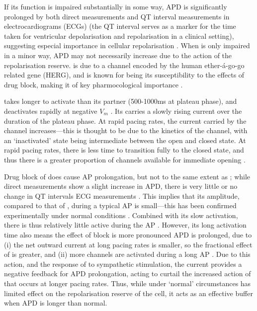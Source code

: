 \documentclass[../thesis-main.tex]{subfiles}
\begin{document}
 If its function is impaired substantially in some way, APD is significantly prolonged by both direct measurements and QT interval measurements in electrocardiograms (ECGs)  (the QT interval serves as a marker for the time taken for ventricular depolarisation and repolarisation in a clinical setting), suggesting especial importance in cellular repolarisation \citep{Varro2000, Lengyel2001, Jost2005}. When \ikr{} is only impaired in a minor way, APD may not necessarily increase due to the action of the repolarisation reserve. \ikr{} is due to a channel encoded by the human ether-\'a-go-go related gene (HERG), and is known for being its susceptibility to the effects of drug block, making it of key pharmocological importance \citep{Vandenberg2001, Haverkamp2000}.
 
 \iks{} takes longer to activate than its partner (500-1000ms at plateau phase), and deactivates rapidly at negative $V_m$ \citep{Jost2005, Varro2011}. Its carries a slowly rising current over the duration of the plateau phase. At rapid pacing rates, the current carried by the \iks{} channel increases---this is thought to be due to the kinetics of the channel, with an `inactivated' state being intermediate between the open and closed state. At rapid pacing rates, there is less time to transition fully to the closed state, and thus there is a greater proportion of \iks{} channels available for immediate opening \citep{Silva2005}.
 
 Drug block of \iks{} does cause AP prolongation, but not to the same extent as \ikr{}; while direct measurements show a slight increase in APD, there is very little or no change in QT intervals ECG measurements \citep{Varro2000, Lengyel2001, Jost2005}. This implies that its amplitude, compared to that of \ikr{}, during a typical AP is small---this has been confirmed experimentally under normal conditions \citep{Varro2011}. Combined with its slow activation, there is thus relatively little \iks{} active during the AP \citep{Jost2005}. However, its long activation time also means the effect of \iks{} block is more pronounced APD is prolonged, due to (i) the net outward current at long pacing rates is smaller, so the fractional effect of \iks{} is greater, and (ii) more channels are activated during a long AP \citep{Carmeliet2006}. Due to this action, and the response of \iks{} to sympathetic stimulation, the current provides a negative feedback for APD prolongation, acting to curtail the increased action of \ica{} that occurs at longer pacing rates. Thus, while under `normal' circumstances \iks{} has limited effect on the repolarisation reserve of the cell, it acts as an effective buffer when APD is longer than normal.
 
\end{document}
